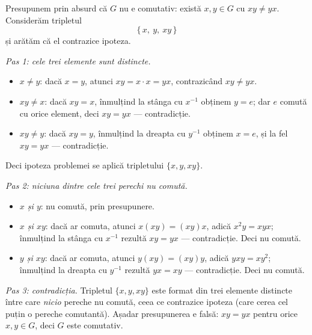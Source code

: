 \begin{solutie}
Presupunem prin absurd că $G$ nu e comutativ: există $x,y\in G$ cu
$xy\neq yx$. Considerăm tripletul
\[
  \{\,x,\ y,\ xy\,\}
\]
și arătăm că el contrazice ipoteza.

\smallskip
\textit{Pas 1: cele trei elemente sunt distincte.}
\begin{itemize}[nosep,leftmargin=1.4em]
  \item $x\neq y$: dacă $x=y$, atunci $xy=x\cdot x=yx$, contrazicând
        $xy\neq yx$.
  \item $xy\neq x$: dacă $xy=x$, înmulțind la stânga cu
        $x^{-1}$ obținem $y=e$; dar $e$ comută cu orice element, deci
        $xy=yx$ --- contradicție.
  \item $xy\neq y$: dacă $xy=y$, înmulțind la dreapta cu $y^{-1}$
        obținem $x=e$, și la fel $xy=yx$ --- contradicție.
\end{itemize}
Deci ipoteza problemei se aplică tripletului $\{x,y,xy\}$.

\smallskip
\textit{Pas 2: niciuna dintre cele trei perechi nu comută.}
\begin{itemize}[nosep,leftmargin=1.4em]
  \item \emph{$x$ și $y$}: nu comută, prin presupunere.
  \item \emph{$x$ și $xy$}: dacă ar comuta, atunci $x(xy)=(xy)x$,
        adică $x^{2}y=xyx$; înmulțind la stânga cu $x^{-1}$
        rezultă $xy=yx$ --- contradicție. Deci nu comută.
  \item \emph{$y$ și $xy$}: dacă ar comuta, atunci $y(xy)=(xy)y$,
        adică $yxy=xy^{2}$; înmulțind la dreapta cu $y^{-1}$
        rezultă $yx=xy$ --- contradicție. Deci nu comută.
\end{itemize}

\smallskip
\textit{Pas 3: contradicția.} Tripletul $\{x,y,xy\}$ este format din trei
elemente distincte între care \emph{nicio} pereche nu comută, ceea ce
contrazice ipoteza (care cerea cel puțin o pereche comutantă).
Așadar presupunerea e falsă: $xy=yx$ pentru orice $x,y\in G$, deci $G$
este comutativ.
\end{solutie}

